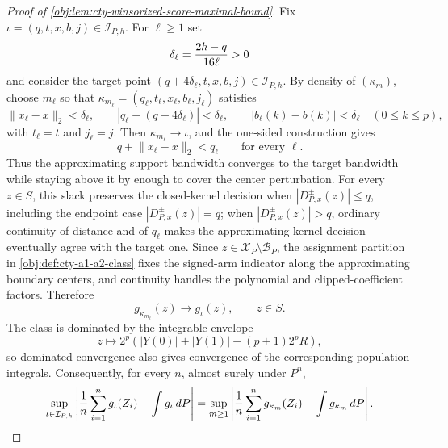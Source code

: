 \documentclass[11pt]{article}
\begin{document}
\begin{proof}[Proof of \cref{obj:lem:cty-winsorized-score-maximal-bound}]
Fix \(\iota=(q,t,x,b,j)\in\mathcal I_{P,h}\).  For \(\ell\geq1\) set
\[
\delta_\ell={2h-q\over 16\ell}>0
\]
and consider the target point \((q+4\delta_\ell,t,x,b,j)\in\mathcal I_{P,h}\).  By density of \((\kappa_m)\), choose \(m_\ell\) so that \(\kappa_{m_\ell}=(q_\ell,t_\ell,x_\ell,b_\ell,j_\ell)\) satisfies
\[
\lVert x_\ell-x\rVert_2<\delta_\ell,
\qquad
|q_\ell-(q+4\delta_\ell)|<\delta_\ell,
\qquad
|b_\ell(k)-b(k)|<\delta_\ell\quad(0\leq k\leq p),
\]
with \(t_\ell=t\) and \(j_\ell=j\).  Then \(\kappa_{m_\ell}\to\iota\), and the one-sided construction gives
\[
q+\lVert x_\ell-x\rVert_2<q_\ell
\qquad\text{for every }\ell .
\]
Thus the approximating support bandwidth converges to the target bandwidth while staying above it by enough to cover the center perturbation.  For every \(z\in S\), this slack preserves the closed-kernel decision when \(|D^{\pm}_{P,x}(z)|\leq q\), including the endpoint case \(|D^{\pm}_{P,x}(z)|=q\); when \(|D^{\pm}_{P,x}(z)|>q\), ordinary continuity of distance and of \(q_\ell\) makes the approximating kernel decision eventually agree with the target one.  Since \(z\in\mathcal X_P\setminus\mathcal B_P\), the assignment partition in \cref{obj:def:cty-a1-a2-class} fixes the signed-arm indicator along the approximating boundary centers, and continuity handles the polynomial and clipped-coefficient factors.  Therefore
\[
g_{\kappa_{m_\ell}}(z)\longrightarrow g_\iota(z),
\qquad z\in S .
\]
The class is dominated by the integrable envelope
\[
z\mapsto 2^p\left(|Y(0)|+|Y(1)|+(p+1)2^pR\right),
\]
so dominated convergence also gives convergence of the corresponding population integrals.  Consequently, for every \(n\), almost surely under \(P^n\),
\[
\sup_{\iota\in\mathcal I_{P,h}}
\left|
{1\over n}\sum_{i=1}^n g_\iota(Z_i)-\int g_\iota\,dP
\right|
=
\sup_{m\geq1}
\left|
{1\over n}\sum_{i=1}^n g_{\kappa_m}(Z_i)-\int g_{\kappa_m}\,dP
\right| .
\]


\end{proof}
\end{document}
